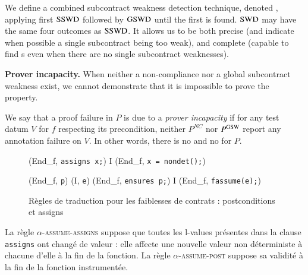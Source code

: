 We define a combined subcontract weakness detection technique, denoted \SWD, applying
first $\mathrm{SSWD}$ followed by  $\mathrm{GSWD}$ until the first \SWCE is found. 
$\mathrm{SWD}$ may have the same four outcomes as  $\mathrm{SSWD}$.
It allows us
to be both precise (and indicate when possible a single subcontract being too weak),
and complete (capable to find \GSWCE{}s even when there are no single subcontract weaknesses).



\textbf{Prover incapacity.}
When neither a non-compliance nor a global subcontract weakness
exist, we cannot demonstrate that it is impossible to prove the property.

\begin{definition} 
\label{def:prov-incap}
We say that a proof failure in $P$ is due to a \emph{prover incapacity} 
if for any test datum $V$ for $f$ respecting its precondition,
neither $P^{NC}$ nor $P^{\mathrm{GSW}}$ report any annotation failure on $V$.
In other words, there is no \NCCE and no \GSWCE for $P$.
\end{definition}





\begin{figure}[bt]
  \scriptsize{
    {
      {}
      {(End_f, \mbox{\lstinline'assigns x;'})
        I \concat (End_f, \mbox{\lstinline'x = nondet();'})}{}
    }

    {
      {(End_f, \mbox{\lstinline'p'})  (I, \mbox{\lstinline'e'})}
      {(End_f, \mbox{\lstinline'ensures p;'})
        I \concat (End_f, \mbox{\lstinline'fassume(e);'})}{}
    }
  }
  \caption{Règles de traduction pour les faiblesses de contrats :
    postconditions et assigns}
  \label{fig:assume-annot}
\end{figure}

La règle \textsc{$\alpha$-assume-assigns} suppose que toutes les l-values
présentes dans la clause \lstinline'assigns' ont changé de valeur : elle affecte
une nouvelle valeur non déterministe à chacune d'elle à la fin de la fonction.
La règle \textsc{$\alpha$-assume-post} suppose sa validité à la fin de la
fonction instrumentée.

